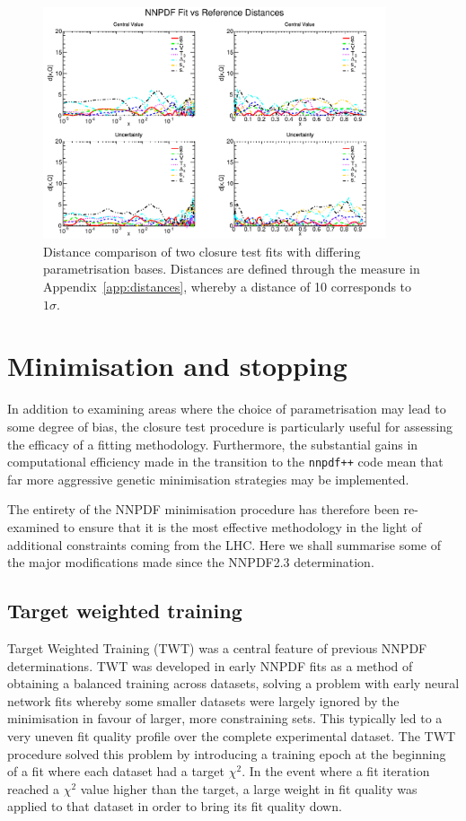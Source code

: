 \begin{figure}[!]
\centering
\includegraphics[width=0.9\textwidth]{7-PostLHC/figs/EVOLvs23BASIS/distances_evol.pdf}
\caption[Distance comparison of two closure test fits with differing parametrisation bases]{Distance comparison of two closure test fits with differing parametrisation bases. Distances are defined through the measure in Appendix~\ref{app:distances}, whereby a distance of 10 corresponds to $1\sigma$.}
\label{fig:EVOLvs23BASIS}
\end{figure}
  
\section{Minimisation and stopping}
In addition to examining areas where the choice of parametrisation may lead to some degree of bias, the closure test procedure is particularly useful for assessing the efficacy of a fitting methodology. Furthermore, the substantial gains in computational efficiency made in the transition to the {\tt nnpdf++} code mean that far more aggressive genetic minimisation strategies may be implemented.

The entirety of the NNPDF minimisation procedure has therefore been re-examined to ensure that it is the most effective methodology in the light of additional constraints coming from the LHC. Here we shall summarise some of the major modifications made since the NNPDF2.3 determination.

\subsection{Target weighted training}
Target Weighted Training (TWT) was a central feature of previous NNPDF determinations. TWT was developed in early NNPDF fits as a method of obtaining a balanced training across datasets, solving a problem with early neural network fits whereby some smaller datasets
were largely ignored by the minimisation in favour of larger, more constraining sets. This typically led to a very uneven fit quality profile over the complete experimental dataset. The TWT procedure solved this problem by introducing a training epoch at the beginning of a fit where each dataset had a target $\chi^2$. In the event where a fit iteration reached a $\chi^2$ value higher than the target, a large weight in fit quality was applied to that dataset in order to bring its fit quality down. 

